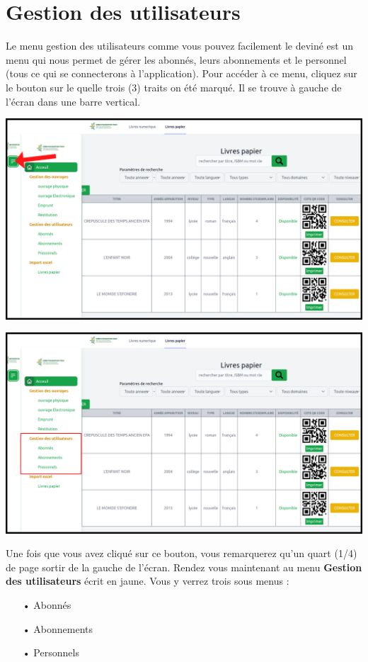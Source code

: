 \documentclass[12pt,a4paper]{article}
\begin{document}
\newpage
\section{Gestion des utilisateurs}
Le menu gestion des utilisateurs comme vous pouvez facilement le deviné est un menu qui
nous permet de gérer les abonnés, leurs abonnements et le personnel (tous ce qui se
connecterons à l'application). Pour accéder à ce menu, cliquez sur le bouton sur le
quelle trois (3) traits on été marqué. Il se trouve à gauche de l'écran dans une barre
vertical. \\

\begin{center}
\includegraphics[scale=0.5]{img/sidebar.png}
\end{center}

\begin{center}
\includegraphics[scale=0.5]{img/gestion_utilisateurs.png}
\end{center}

Une fois que vous avez cliqué sur ce bouton, vous remarquerez qu'un quart (1/4) de page 
sortir de la gauche de l'écran. Rendez vous maintenant au menu \textbf{Gestion des
utilisateurs} écrit en jaune. Vous y verrez trois sous menus :
\begin{itemize}
\item[•] Abonnés
\item[•] Abonnements
\item[•] Personnels
\end{itemize}
\end{document}
